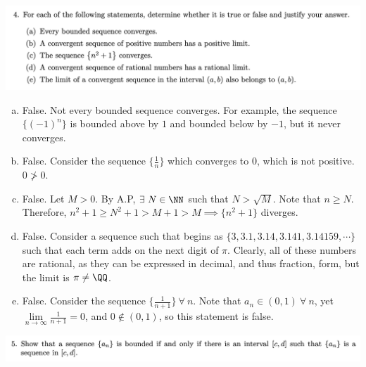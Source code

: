 \documentclass[12pt]{scrartcl}
\begin{document}
\newpage

\includegraphics[width=15cm]{4.png}

\begin{enumerate}[a.]
  
\item False. Not every bounded sequence converges. For example, the sequence $\{(-1)^{n}\}$
is bounded above by $1$ and bounded below by $-1$, but it never converges.
\item False. Consider the sequence $\{\frac{1}{n}\}$ which converges to $0$, which is not positive. $0 \not> 0$.
\item False. Let $M > 0$. By A.P, $\exists \ N \in \NN$ such that $N > \sqrt{M}$. Note that $n \geq N$. Therefore, 
$n^2 + 1 \geq N^2 + 1 > M + 1 > M \implies \{n^2 + 1\}$ diverges. 
\item False. Consider a sequence such that begins as $\{3, 3.1, 3.14, 3.141, 3.14159, \cdots \}$
such that each term adds on the next digit of $\pi$. Clearly, all of these numbers are rational, as they can 
be expressed in decimal, and thus fraction, form, but the limit is $\pi \neq \QQ$. 
\item False. Consider the sequence $\{\frac{1}{n + 1}\} \ \forall \ n$. Note that $a_n \in (0, 1) \ \forall \ n$, 
yet $\underset{n\to\infty}{\lim}\frac{1}{n + 1} = 0$, and $0 \notin (0, 1)$, so this statement is false. 

\end{enumerate}

\newpage
\includegraphics[width=15cm]{5.png}
\end{document}

